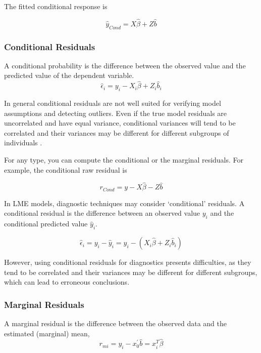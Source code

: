 \documentclass[12pt, a4paper]{report}
\theoremstyle{plain}
\theoremstyle{definition}
\theoremstyle{remark}
\begin{document}
	The fitted conditional response is
	
	\[ \hat{y}_{Cond} = X \hat{\beta} + Z \hat{b} \]

	\subsubsection*{Conditional Residuals}
	A conditional probability is the difference between the observed value and the predicted value of the dependent variable.
	\begin{equation*}
	\hat{\epsilon}_{i} = y_{i} - X_{i}\hat{\beta} + Z_{i}\hat{b}_{i}
	\end{equation*}
	
	In general conditional residuals are not well suited for verifying model assumptions and detecting outliers. Even if the true model residuals are uncorrelated and have equal variance, conditional variances will tend to be correlated and their variances may be different for different subgroups of individuals \citep{west}.
	
	
	For any type, you can compute the conditional or the marginal residuals. For example, the conditional raw residual is
	
	
	\[ r_{Cond} = y - X \hat{\beta} - Z \hat{b} \]
	
	
	
	In LME models, diagnostic techniques may consider `conditional' residuals. A conditional residual is the difference between an observed value $y_{i}$ and the conditional predicted value $\hat{y}_{i} $.
	
	\[ \hat{\epsilon}_{i} = y_{i} - \hat{y}_{i} = y_{i} - ( X_{i}\hat{\beta} + Z_{i}\hat{b}_{i}) \]
	
	However, using conditional residuals for diagnostics presents difficulties, as they tend to be correlated and their variances may be different for different subgroups, which can lead to erroneous conclusions.
	
	
	


	\subsubsection*{Marginal Residuals}
	A marginal residual is the difference between the observed data and the estimated (marginal) mean, 
	\[r_{mi} = y_i - x_0^{\prime} \hat{b} =x^{T}_{i}\hat{\beta}\]
	
\end{document}
